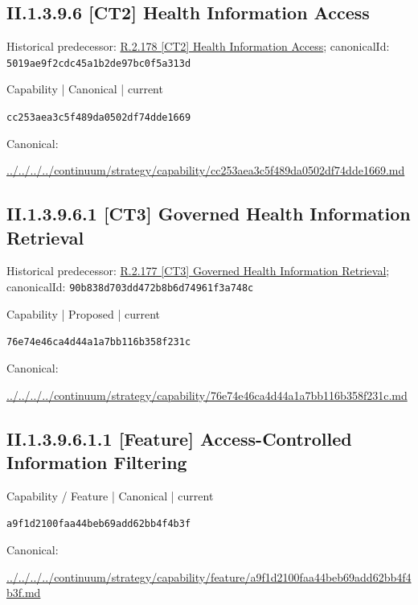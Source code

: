 \documentclass[10pt,a4paper]{article}
\begin{document}
\subsection*{II.1.3.9.6 [CT2] Health Information Access}
Historical predecessor: \hyperref[element-5019ae9f2cdc45a1b2de97bc0f5a313d]{R.2.178 [CT2] Health Information Access}; canonicalId: \texttt{5019ae9f2cdc45a1b2de97bc0f5a313d}\par
\label{element-cc253aea3c5f489da0502df74dde1669}
{\small Capability | Canonical | current}\par
\texttt{cc253aea3c5f489da0502df74dde1669}\par
Canonical: \par
{\footnotesize\url{../../../../continuum/strategy/capability/cc253aea3c5f489da0502df74dde1669.md}}\par
\subsection*{II.1.3.9.6.1 [CT3] Governed Health Information Retrieval}
Historical predecessor: \hyperref[element-90b838d703dd472b8b6d74961f3a748c]{R.2.177 [CT3] Governed Health Information Retrieval}; canonicalId: \texttt{90b838d703dd472b8b6d74961f3a748c}\par
\label{element-76e74e46ca4d44a1a7bb116b358f231c}
{\small Capability | Proposed | current}\par
\texttt{76e74e46ca4d44a1a7bb116b358f231c}\par
Canonical: \par
{\footnotesize\url{../../../../continuum/strategy/capability/76e74e46ca4d44a1a7bb116b358f231c.md}}\par
\subsection*{II.1.3.9.6.1.1 [Feature] Access-Controlled Information Filtering}
\label{element-a9f1d2100faa44beb69add62bb4f4b3f}
{\small Capability / Feature | Canonical | current}\par
\texttt{a9f1d2100faa44beb69add62bb4f4b3f}\par
Canonical: \par
{\footnotesize\url{../../../../continuum/strategy/capability/feature/a9f1d2100faa44beb69add62bb4f4b3f.md}}\par
\end{document}
